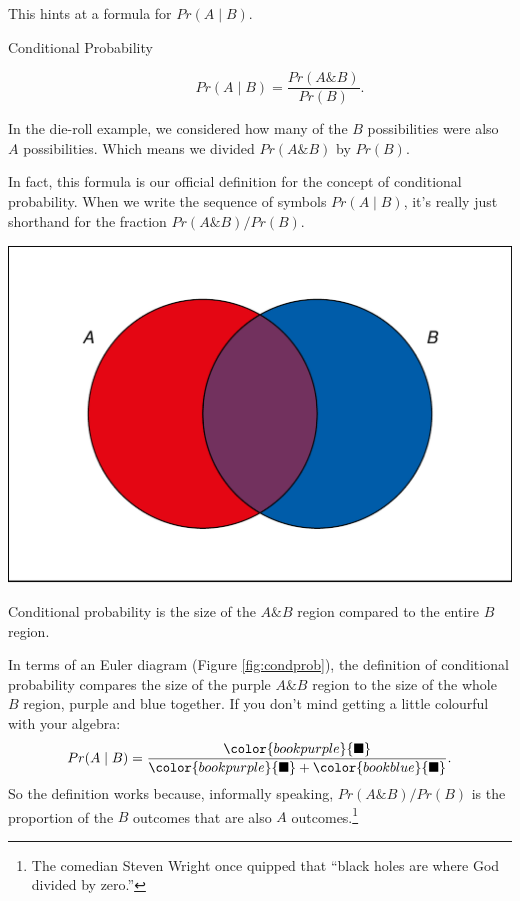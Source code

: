 \documentclass[justified]{tufte-book}
\newcommand{\given}{\mid}
\renewcommand{\wedge}{\mathbin{\&}}
\newcommand{\p}{Pr}
\theoremstyle{definition}
\theoremstyle{definition}
\theoremstyle{definition}
\theoremstyle{remark}
\begin{document}
This hints at a formula for \(\p(A \given B)\).

\begin{description}
\item[Conditional Probability]
\[ \p(A \given B) = \frac{\p(A \wedge B)}{\p(B)}. \]
\end{description}

In the die-roll example, we considered how many of the \(B\) possibilities were also \(A\) possibilities. Which means we divided \(\p(A \wedge B)\) by \(\p(B)\).

In fact, this formula is our official definition for the concept of conditional probability. When we write the sequence of symbols \(\p(A \given B)\), it's really just shorthand for the fraction \(\p(A \wedge B) / \p(B)\).

\begin{marginfigure}
\includegraphics{_main_files/figure-latex/condprob-1} \caption[Conditional probability is the size of the $A \wedge B$ region compared to the entire $B$ region]{Conditional probability is the size of the $A \wedge B$ region compared to the entire $B$ region.}\label{fig:condprob}
\end{marginfigure}

In terms of an Euler diagram (Figure \ref{fig:condprob}), the definition of conditional probability compares the size of the purple \(A \wedge B\) region to the size of the whole \(B\) region, purple and blue together. If you don't mind getting a little colourful with your algebra:
\[
  \p(A \given B) = \frac{\color{bookpurple}{\blacksquare}}{\color{bookpurple}{\blacksquare} + \color{bookblue}{\blacksquare}}.
\]
So the definition works because, informally speaking, \(\p(A \wedge B)/\p(B)\) is the proportion of the \(B\) outcomes that are also \(A\) outcomes.\footnote{The comedian Steven Wright once quipped that ``black holes are where God divided by zero.''}
\end{document}
